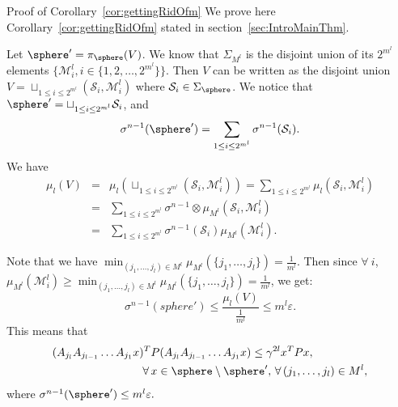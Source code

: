 \begin{section}{Proof of Corollary~\ref{cor:gettingRidOfm}}\label{proof:cor_m}
We prove here Corollary~\ref{cor:gettingRidOfm} stated in section~\ref{sec:IntroMainThm}.

Let $\sphere' = \pi_{\sphere}(V)$. We know that $\Sigma_{M^l}$ is the disjoint union of its $2^{m^l}$ elements $\{\mathcal{M}^l_i, i \in \{1,2, \dots, 2^{m^l} \} \}$. Then $V$ can be written as the disjoint union $V = \sqcup_{1 \leq i \leq 2^{m^l}} (\mathcal{S}_i, \mathcal{M}^l_i)$ where $\mathcal{S}_i \in \Sigma_{\sphere}$. We notice that 
$\sphere' = \sqcup_{1 \leq i \leq 2^{m^l}} \mathcal{S}_i$, 
and
\begin{equation*}
\sigma^{n-1} (\sphere') = \sum_{1 \leq i \leq 2^{m^l}} \sigma^{n-1} (\mathcal{S}_i).
\end{equation*}
We have 
\begin{eqnarray*}
\mu_l(V) &=& \mu_l \left( \sqcup_{1 \leq i \leq 2^{m^l}} (\mathcal{S}_i, \mathcal{M}^l_i) \right) = \sum_{1 \leq i \leq 2^{m^l}} \mu_l \left( \mathcal{S}_i, \mathcal{M}^l_i \right) \\
 &=& \sum_{1 \leq i \leq 2^{m^l}} \sigma^{n-1} \otimes \mu_{M^l} \left( \mathcal{S}_i, \mathcal{M}^l_i \right) \\
 &=& \sum_{1 \leq i \leq 2^{m^l}} \sigma^{n-1}(\mathcal{S}_i) \mu_{M^l} (\mathcal{M}^l_i).
\end{eqnarray*}

Note that we have $\min_{(j_1,\dots,j_l) \in M^l} \mu_{M^l}(\{j_1,\dots,j_l\}) = \frac{1}{m^l}.$ Then since $ \forall \ i$, $\mu_{M^l}(\mathcal{M}^l_i) \geq \min_{(j_1,\dots,j_l) \in M^l} \mu_{M^l}(\{j_1,\dots,j_l\}) = \frac{1}{m^l}$, we get:
\begin{equation}
\sigma^{n-1}(sphere') \leq \frac{\mu_l(V)}{\frac{1}{m^l}} \leq m^l \varepsilon.
\end{equation}
This means that 
\begin{equation}\label{eqn:P2}
\begin{aligned}
& (A_{j_l} A_{j_{l-1}} \dots A_{j_1} x)^T P (A_{j_l} A_{j_{l-1}} \dots A_{j_1} x) \leq \gamma^{2l} x^T P x,\\
& \qquad \qquad \qquad \qquad \forall\, x \in \sphere \setminus \sphere', \,\forall\, (j_1,\dots,j_l) \in M^l,
\end{aligned}
\end{equation}
where $\sigma^{n-1}(\sphere') \leq m^l \varepsilon.$

\end{section}



